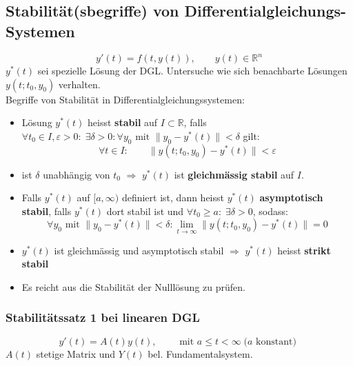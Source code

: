 \documentclass[a4paper]{article}
\newcommand{\R}{\mathbb{R}}
\begin{document}
\subsection{Stabilität(sbegriffe) von Differentialgleichungs-Systemen}
\[
	y' (t) = f (t, y(t)), \qquad
	y(t) \in \R ^{n}
\] 
$y^{*} (t)$ sei spezielle Lösung der DGL.
Untersuche wie sich benachbarte Lösungen $y(t; t_0, y_0)$
verhalten.
\\

Begriffe von Stabilität in Differentialgleichungssystemen:

\begin{itemize}
	\item Lösung $y^{*} (t)$ heisst \textbf{stabil} auf $I \subset \R$,
		falls $\forall t_0 \in I, \varepsilon > 0: \;
		\exists \delta > 0: \forall y_0 \text{ mit }
		\| y_0 - y^{*} (t) \| < \delta$ gilt:
		\[
			\forall t \in I: \qquad
			\| y(t; t_0, y_0) - y^{*} (t) \| < \varepsilon
		\] 
	\item ist $\delta$ unabhängig von $t_0$ $\Rightarrow$
		$y^{*} (t)$ ist \textbf{gleichmässig stabil} auf $I$.
	\item Falls $y ^{*} (t)$ auf $[a, \infty)$ definiert ist, dann heisst
		$y^{*} (t)$ \textbf{asymptotisch stabil}, falls $y ^{*} (t)$
		dort stabil ist und $\forall t_0 \geq a:\; \exists \delta > 0$,
		sodass:
		\[
		\forall y_0 \text{ mit } \| y_0 - y^{*} (t) \| < \delta :
		\lim_{t \to \infty} \| y(t; t_0, y_0) - y^{*} (t) \| = 0
		\] 
	\item $y ^{*} (t)$ ist gleichmässig und asymptotisch stabil
		$\Rightarrow$ $y ^{*} (t)$ heisst \textbf{strikt stabil} 
\end{itemize}

\begin{itemize}
	\item Es reicht aus die Stabilität der Nulllösung zu prüfen.
\end{itemize}

\subsubsection{Stabilitätssatz 1 bei linearen DGL}
\[
	y' (t) = A(t) y(t), \qquad
	\text{ mit } a \leq t < \infty
	\; (a \text{ konstant) }
\] 
$A(t)$ stetige Matrix und $Y(t)$ bel. Fundamentalsystem.
\end{document}
